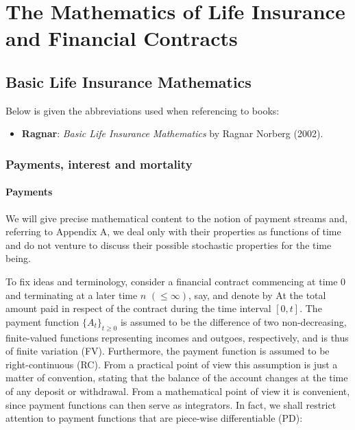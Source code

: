 \documentclass[a4paper,10pt,openany]{book}
\providecommand{\tightlist}{%
 \setlength{\itemsep}{0pt}\setlength{\parskip}{0pt}}
\begin{document}
\hypertarget{part-the-mathematics-of-life-insurance-and-financial-contracts}{%
\part{The Mathematics of Life Insurance and Financial Contracts}\label{part-the-mathematics-of-life-insurance-and-financial-contracts}}

\hypertarget{basic-life-insurance-mathematics}{%
\chapter{Basic Life Insurance Mathematics}\label{basic-life-insurance-mathematics}}

Below is given the abbreviations used when referencing to books:

\begin{itemize}
\tightlist
\item
  \textbf{Ragnar}: \emph{Basic Life Insurance Mathematics} by Ragnar Norberg (2002).\cite{norberg2002}
\end{itemize}

\hypertarget{payments-interest-and-mortality}{%
\section{Payments, interest and mortality}\label{payments-interest-and-mortality}}

\hypertarget{payments}{%
\subsection{Payments}\label{payments}}

We will give precise mathematical content to the notion of payment streams and, referring to Appendix A, we deal only with their properties as functions of time and do not venture to discuss their possible stochastic properties for the time being.

To fix ideas and terminology, consider a financial contract commencing at time 0 and terminating at a later time \(n\) \((\le \infty)\), say, and denote by At the total amount paid in respect of the contract during the time interval \([0, t]\). The payment function \(\{A_t\}_{t\ge 0}\) is assumed to be the difference of two non-decreasing, finite-valued functions representing incomes and outgoes, respectively, and is thus of finite variation (FV). Furthermore, the payment function is assumed to be right-continuous (RC). From a practical point of view this assumption is just a matter of convention, stating that the balance of the account changes at the time of any deposit or withdrawal. From a mathematical point of view it is convenient, since payment functions can then serve as integrators. In fact, we shall restrict attention to payment functions that are piece-wise differentiable (PD):
\end{document}
